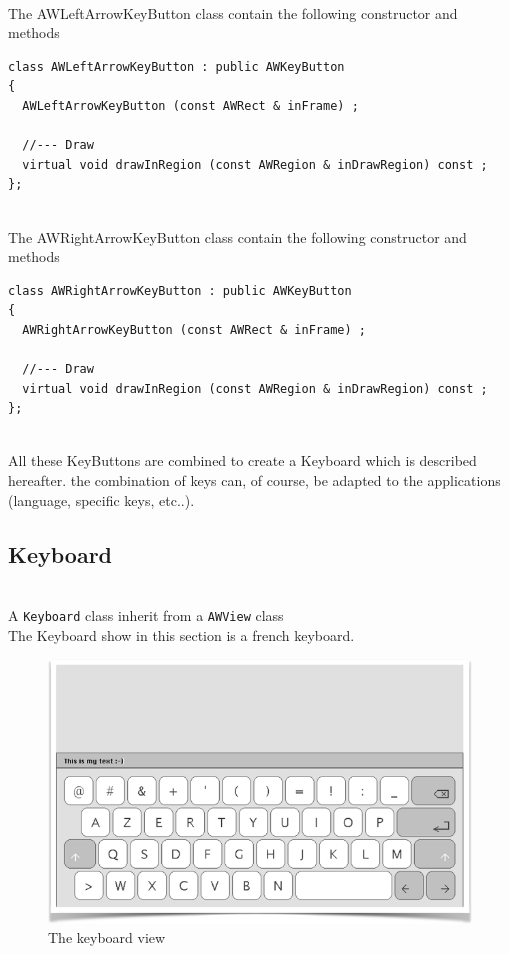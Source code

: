 \documentclass[a4paper,11pt]{extarticle}
\begin{document}
~\\ The AWLeftArrowKeyButton class contain the following constructor and methods

\begin{lstlisting}[language=Arduinonl]
class AWLeftArrowKeyButton : public AWKeyButton
{
  AWLeftArrowKeyButton (const AWRect & inFrame) ;
  
  //--- Draw
  virtual void drawInRegion (const AWRegion & inDrawRegion) const ;
};
\end{lstlisting}

~\\ The AWRightArrowKeyButton class contain the following constructor and methods

\begin{lstlisting}[language=Arduinonl]
class AWRightArrowKeyButton : public AWKeyButton
{
  AWRightArrowKeyButton (const AWRect & inFrame) ;
  
  //--- Draw
  virtual void drawInRegion (const AWRegion & inDrawRegion) const ;
};
\end{lstlisting}

~\\All these KeyButtons are combined to create a Keyboard which is described hereafter. the combination of keys can, of course, be adapted to the applications (language, specific keys, etc..).

\newpage
\subsection{Keyboard}

~\\ A \texttt{Keyboard} class inherit from a \texttt{AWView} class
~\\ The Keyboard show in this section is a french keyboard.
~\\

\begin{figure}[htbp]
   \centering
   \includegraphics[scale=0.7]{AWFig18.png} 
   \caption{The keyboard view}
   \label{fig:18 }
\end{figure}
\end{document}
